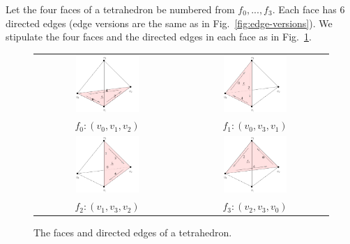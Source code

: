 Let the four faces of a tetrahedron be numbered from $f_0, ..., f_3$.  Each face has $6$ directed edges (edge versions are the same as in Fig.~\ref{fig:edge-versions}). We stipulate the four faces and the directed edges in each face as in Fig.~\ref{fig:triface}.

\begin{figure}
  \centering
  \begin{tabular}{cc}
  \includegraphics[width=0.45\textwidth]{../figs/triface-f0} &
  \includegraphics[width=0.45\textwidth]{../figs/triface-f1} \\
  $f_0: (v_0, v_1, v_2)$ & $f_1: (v_0, v_3, v_1)$\\
  \includegraphics[width=0.45\textwidth]{../figs/triface-f2} &
  \includegraphics[width=0.45\textwidth]{../figs/triface-f3} \\
  $f_2: (v_1, v_3, v_2)$ & $f_3: (v_2, v_3, v_0)$
  \end{tabular}
\caption{The faces and directed edges of a tetrahedron.}
\label{fig:triface}
\end{figure}
 
